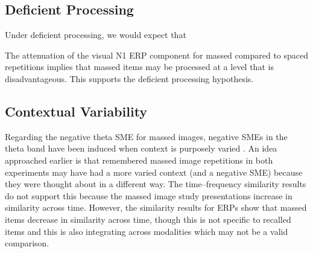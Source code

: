 
\subsection{Deficient Processing}

Under deficient processing, we would expect that


The attenuation of the visual N1 ERP component for massed compared to spaced repetitions implies that massed items may be processed at a level that is disadvantageous.  This supports the deficient processing hypothesis.



\subsection{Contextual Variability}




Regarding the negative theta SME for massed images, negative SMEs in the theta band have been induced when context is purposely varied \cite{StauHans2013}.  An idea approached earlier is that remembered massed image repetitions in both experiments may have had a more varied context (and a negative SME) because they were thought about in a different way.  The time--frequency similarity results do not support this because the massed image study presentations increase in similarity across time.  However, the similarity results for ERPs show that massed items decrease in similarity across time, though this is not specific to recalled items and this is also integrating across modalities which may not be a valid comparison.

